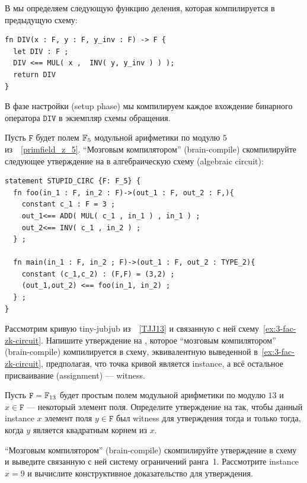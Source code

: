 В  мы определяем следующую функцию деления, которая компилируется в предыдущую схему:
\begin{lstlisting}
fn DIV(x : F, y : F, y_inv : F) -> F {
  let DIV : F ;
  DIV <== MUL( x ,  INV( y, y_inv ) ) );
  return DIV
}
\end{lstlisting}
В фазе настройки (setup phase) мы компилируем каждое вхождение бинарного оператора $\mathtt{DIV}$ в экземпляр схемы обращения.
\begin{exercise} Пусть $\mathtt{F}$ будет полем $\mathbb{F}_5$ модульной арифметики по модулю $5$ из~\examplename{}~\ref{primfield_z_5}. ``Мозговым компилятором'' (brain-compile) скомпилируйте следующее утверждение на  в алгебраическую схему (algebraic circuit):
\begin{lstlisting}
statement STUPID_CIRC {F: F_5} {
  fn foo(in_1 : F, in_2 : F)->(out_1 : F, out_2 : F,){
    constant c_1 : F = 3 ;
    out_1<== ADD( MUL( c_1 , in_1 ) , in_1 ) ;
    out_2<== INV( c_1 , in_2 ) ;
  } ;
    
  fn main(in_1 : F, in_2 ; F)->(out_1 : F, out_2 : TYPE_2){
	constant (c_1,c_2) : (F,F) = (3,2) ;
    (out_1,out_2) <== foo(in_1, in_2) ;
  } ;
}
\end{lstlisting}
\end{exercise}
\begin{exercise} Рассмотрим кривую tiny-jubjub из~\examplename{}~\ref{TJJ13} и связанную с ней схему~\ref{ex:3-fac-zk-circuit}. Напишите утверждение на , которое ``мозговым компилятором'' (brain-compile) компилируется в схему, эквивалентную выведенной в~\ref{ex:3-fac-zk-circuit}, предполагая, что точка кривой является instance, а всё остальное присваивание (assignment) --- witness.
\end{exercise}
\begin{exercise} Пусть $\mathtt{F}=\mathbb{F}_{13}$ будет простым полем модульной арифметики по модулю $13$ и $x\in\mathtt{F}$ --- некоторый элемент поля. Определите утверждение на  так, чтобы данный instance $x$ элемент поля $y\in\mathtt{F}$ был witness для утверждения тогда и только тогда, когда $y$ является квадратным корнем из $x$.

``Мозговым компилятором'' (brain-compile) скомпилируйте утверждение в схему и выведите связанную с ней систему ограничений ранга~1. Рассмотрите instance $x=9$ и вычислите конструктивное доказательство для утверждения.

\end{exercise}
